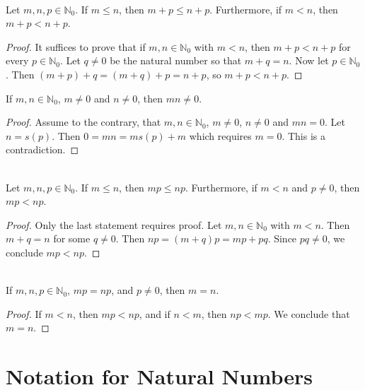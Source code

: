 \begin{theorem}{}\\ 
Let $m,n,p\in \mathbb{N}_0$.  If $m\le n$, then
$m+p\le n+p$. Furthermore, if $m<n$, then $m+p<n+p$.
\end{theorem}

\begin{proof}
It suffices to prove that if $m,n\in \mathbb{N}_0$ with $m<n$, then
$m+p<n+p$ for every $p\in\mathbb{N}_0$.  Let $q\neq0$ be
the natural number so that $m+q =n$.  
Now let $p\in \mathbb{N}_0$.
Then $(m+p)+q=(m+q)+p=n+p$, so $m+p < n+p$.
\end{proof} 

\begin{lemma}
If $m,n\in \mathbb{N}_0$, $m\neq0$ and $n\neq0$, then $mn\neq0$.
\end{lemma}
\begin{proof}
Assume to the contrary, that $m,n\in \mathbb{N}_0$, $m\neq0$, $n\neq0$
and $mn=0$.  Let $n=s(p)$.  Then $0=mn= ms(p)+m$ which requires
$m=0$.  This is a contradiction.
\end{proof}

\begin{theorem}{}\\  
Let $m,n,p\in \mathbb{N}_0$.  If
$m\le n$, then $mp\le np$.  Furthermore, if $m<n$ and $p\neq0$,
then $mp<np$.
\end{theorem}

\begin{proof} Only the last statement requires proof.  Let 
$m,n\in\mathbb{N}_0$ with $m< n$.  Then $m+q=n$ for some $q\neq0$.
Then $np=(m+q)p=mp+pq$.  Since $pq\neq0$, we conclude $mp<np$.
\end{proof}

\begin{corollary}{}\\
If $m,n,p\in \mathbb{N}_0$, $mp=np$, and $p\neq 0$, then $m=n$.
\end{corollary}

\begin{proof}
If $m<n$, then $mp<np$, and if $n<m$, then
$np<mp$.  We conclude that $m=n$. 
\end{proof}

\section{Notation for Natural Numbers}\label{s:decimal}

